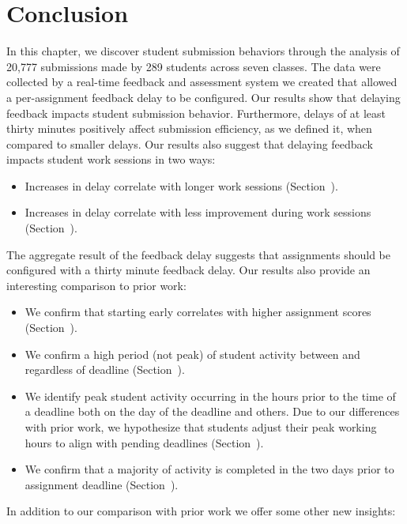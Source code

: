 \section{Conclusion} 
In this chapter, we discover student submission behaviors through the analysis
of 20,777 submissions made by 289 students across seven classes. The data were
collected by a real-time feedback and assessment system we created that allowed
a per-assignment feedback delay to be configured. Our results show that
delaying feedback impacts student submission behavior. Furthermore, delays of
at least thirty minutes positively affect submission efficiency, as we defined
it, when compared to smaller delays. Our results also suggest that delaying
feedback impacts student work sessions in two ways:

\begin{itemize}
\item Increases in delay correlate with longer work sessions
  (Section~).
\item Increases in delay correlate with less improvement during work sessions
  (Section~).
\end{itemize}

The aggregate result of the feedback delay suggests that assignments should be
configured with a thirty minute feedback delay. Our results also provide an
interesting comparison to prior work:

\begin{itemize}
\item We confirm that starting early correlates with higher assignment
  scores (Section~).
\item We confirm a high period (not peak) of student activity between 
  and  regardless of deadline (Section~).
\item We identify peak student activity occurring in the hours prior to the
  time of a deadline both on the day of the deadline and others. Due to our
  differences with prior work, we hypothesize that students adjust their peak
  working hours to align with pending deadlines (Section~).
\item We confirm that a majority of activity is completed in the two days prior
  to assignment deadline (Section~).
\end{itemize}

In addition to our comparison with prior work we offer some other new insights:

